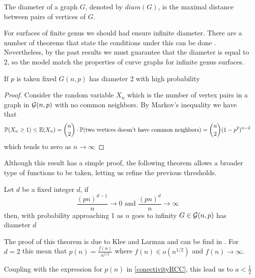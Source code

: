 The diameter of a graph $G$, denoted by $diam(G)$, is the maximal distance between pairs of vertices of $G$.

For surfaces of finite genus we should had ensure infinite diameter. There are a number of theorems that state the conditions under this can be done \cite[Bollobás, p.~259]{Bollobas}. Nevertheless, by the past results we must guarantee that the diameter is equal to 2, so the model match the properties of curve graphs for infinite genus surfaces.

\begin{theorem}
If $p$ is taken fixed $G(n,p)$ has diameter 2 with high probability 
\end{theorem}

\begin{proof}
Consider the random variable $X_{n}$ which is the number of vertex pairs in a graph in $\mathcal{G}(n,p)$ with no common neighbors. By Markov's inequality we have that
$$\mathbb{P}(X_{n} \geq 1)\leq \mathbb{E}(X_{n}) = \binom{n}{2} \cdot \mathbb{P}(\text{two vertices doesn't have common neighbors}) = \binom{n}{2} (1-p^{2})^{n-2}$$
which tends to zero as $n\to \infty$
\end{proof}

Although this result has a simple proof, the following theorem allows a broader type of functions to be taken, letting us refine the previous thresholds.

\begin{theorem}
Let $d$ be a fixed integer $d$, if 
$$\frac{(pn)^{d-1}}{n} \to 0 \text{ and } \frac{(pn)^{d}}{n} \to \infty $$
then, with probability approaching 1 as $n$ goes to infinity $G\in\mathcal{G}(n,p)$ has diameter $d$
\end{theorem}

The proof of this theorem is due to Klee and Larman and can be find in \cite[Klee, Larman 81]{diameters}. For $d=2$ this mean that $p(n)= \frac{f(n)}{n^{1/2}}$ where $f(n)\in o(n^{1/2})$ and $f(n)\to \infty$.

Coupling with the expression for $p(n)$ in \ref{conectivityRCC}, this lead us to $a<\frac{1}{2}$




